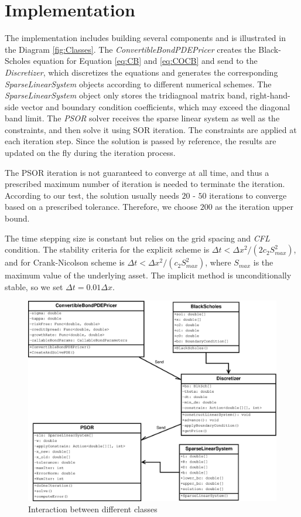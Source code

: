 \documentclass[12pt]{article}
\begin{document}
\section{Implementation}
The implementation includes building several components and is illustrated in the Diagram \ref{fig:Classes}. The \textit{ConvertibleBondPDEPricer} creates the Black-Scholes equation for Equation \ref{eq:CB} and \ref{eq:COCB} and send to the \textit{Discretizer}, which discretizes the equations and generates the corresponding \textit{SparseLinearSystem} objects according to different numerical schemes. The \textit{SparseLinearSystem} object only stores the tridiagnoal matrix band, right-hand-side vector and boundary condition coefficients, which may exceed the diagonal band limit. The \textit{PSOR} solver receives the sparse linear system as well as the constraints, and then solve it using SOR iteration. The constraints are applied at each iteration step. Since the solution is passed by reference, the results are updated on the fly during the iteration process.

The PSOR iteration is not guaranteed to converge at all time, and thus a prescribed maximum number of iteration is needed to terminate the iteration. According to our test, the solution usually needs $20$ - $50$ iterations to converge based on a prescribed tolerance. Therefore, we choose $200$ as the iteration upper bound.

The time stepping size is constant but relies on the grid spacing and \textit{CFL} condition. The stability criteria for the explicit scheme is $\Delta t < \Delta x^2/(2c_2S_{max}^2)$, and for Crank-Nicolson scheme is $\Delta t < \Delta x^2/(c_2S_{max}^2)$, where $S_{max}$ is the maximum value of the underlying asset. The implicit method is unconditionally stable, so we set $\Delta t = 0.01\Delta x$.
\begin{figure}
\includegraphics[width=\textwidth]{Figures/CBobjects}
\caption{Interaction between different classes}
\end{figure}
\label{fig:Classes}
\end{document}
